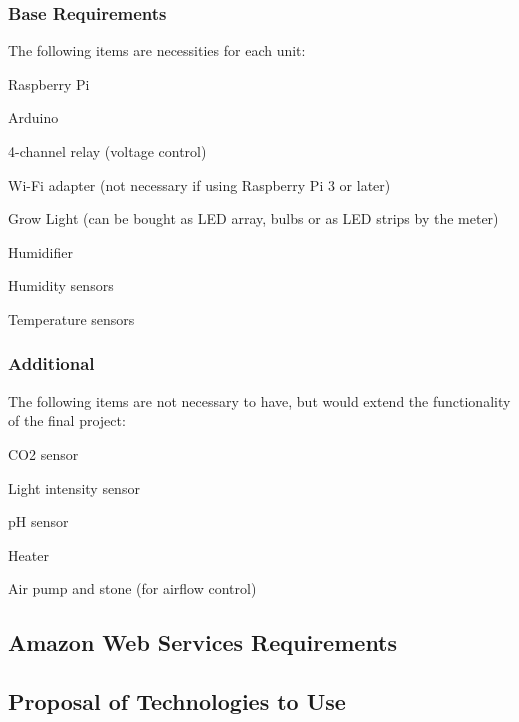 \documentclass{article}
\begin{document}
		\subsubsection{Base Requirements}
			The following items are necessities for each unit:
			\begin{list}
				\item Raspberry Pi
				\item Arduino
				\item 4-channel relay (voltage control)
				\item Wi-Fi adapter (not necessary if using Raspberry Pi 3 or later)
				\item Grow Light (can be bought as LED array, bulbs or as LED strips by the meter)
				\item Humidifier
				\item Humidity sensors
				\item Temperature sensors
			\end{list}
		\subsubsection{Additional}
			The following items are not necessary to have, but would extend the functionality of the final project:
			\begin{list}
				\item CO2 sensor
				\item Light intensity sensor
				\item pH sensor
				\item Heater
				\item Air pump and stone (for airflow control)
			\end{list}
	\subsection{Amazon Web Services Requirements}
	\subsection{Proposal of Technologies to Use}
\end{document}
